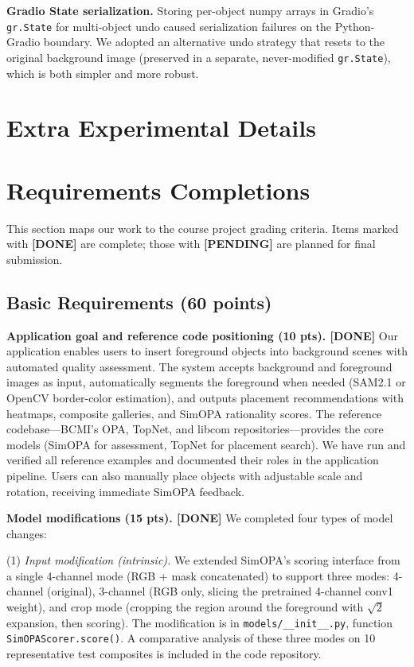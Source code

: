\documentclass[10pt,twocolumn]{article}
\begin{document}
\textbf{Gradio State serialization.} Storing per-object numpy arrays in Gradio's \texttt{gr.State} for multi-object undo caused serialization failures on the Python-Gradio boundary. We adopted an alternative undo strategy that resets to the original background image (preserved in a separate, never-modified \texttt{gr.State}), which is both simpler and more robust.

\section{Extra Experimental Details}

\section{Requirements Completions}

This section maps our work to the course project grading criteria. Items marked with \textbf{[DONE]} are complete; those with \textbf{[PENDING]} are planned for final submission.

\subsection{Basic Requirements (60 points)}

\textbf{Application goal and reference code positioning (10 pts). [DONE]} Our application enables users to insert foreground objects into background scenes with automated quality assessment. The system accepts background and foreground images as input, automatically segments the foreground when needed (SAM2.1 or OpenCV border-color estimation), and outputs placement recommendations with heatmaps, composite galleries, and SimOPA rationality scores. The reference codebase---BCMI's OPA, TopNet, and libcom repositories---provides the core models (SimOPA for assessment, TopNet for placement search). We have run and verified all reference examples and documented their roles in the application pipeline. Users can also manually place objects with adjustable scale and rotation, receiving immediate SimOPA feedback.

\textbf{Model modifications (15 pts). [DONE]} We completed four types of model changes:

(1) \textit{Input modification (intrinsic).} We extended SimOPA's scoring interface from a single 4-channel mode (RGB + mask concatenated) to support three modes: 4-channel (original), 3-channel (RGB only, slicing the pretrained 4-channel conv1 weight), and crop mode (cropping the region around the foreground with $\sqrt{2}$ expansion, then scoring). The modification is in \texttt{models/\_\_init\_\_.py}, function \texttt{SimOPAScorer.score()}. A comparative analysis of these three modes on 10 representative test composites is included in the code repository.
\end{document}
